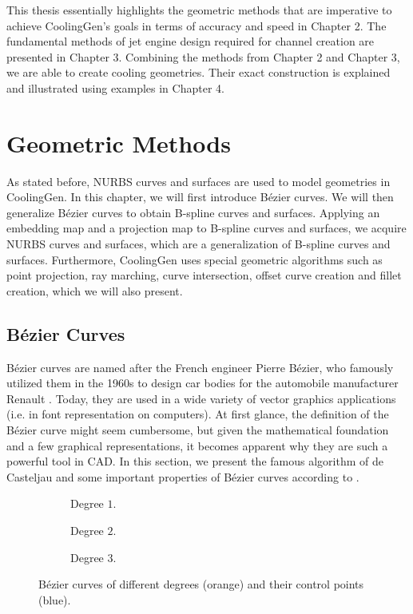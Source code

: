 \documentclass[a4paper, 11pt]{report}
\theoremstyle{definition}
\begin{document}
		This thesis essentially highlights the geometric methods that are imperative to achieve {CoolingGen}'s goals in terms of accuracy and speed in Chapter 2. The fundamental methods of jet engine design required for channel creation are presented in Chapter 3. Combining the methods from Chapter 2 and Chapter 3, we are able to create cooling geometries. Their exact construction is explained and illustrated using examples in Chapter 4.

\chapter{Geometric Methods}\label{chap:methods}
	As stated before, NURBS curves and surfaces are used to model geometries in CoolingGen. In this chapter, we will first introduce Bézier curves. We will then generalize Bézier curves to obtain B-spline curves and surfaces. Applying an embedding map and a projection map to B-spline curves and surfaces, we acquire NURBS curves and surfaces, which are a generalization of B-spline curves and surfaces. Furthermore, CoolingGen uses special geometric algorithms such as point projection, ray marching, curve intersection, offset curve creation and fillet creation, which we will also present.

\section{Bézier Curves}
	Bézier curves are named after the French engineer Pierre Bézier, who famously utilized them in the 1960s to design car bodies for the automobile manufacturer Renault \cite{Bezier1968}. Today, they are used in a wide variety of vector graphics applications (i.e. in font representation on computers). At first glance, the definition of the Bézier curve might seem cumbersome, but given the mathematical foundation and a few graphical representations, it becomes apparent why they are such a powerful tool in CAD. In this section, we present the famous algorithm of de Casteljau and some important properties of Bézier curves according to \cite{Farin2001}.

	\begin{figure}[H]
		\centering
		\begin{subfigure}{0.25\textwidth}
			
			\caption{Degree $1$.}
		\end{subfigure}
		\begin{subfigure}{0.25\textwidth}
			
			\caption{Degree $2$.}
		\end{subfigure}
		\begin{subfigure}{0.25\textwidth}
			
			\caption{Degree $3$.}
		\end{subfigure}
		\caption{Bézier curves of different degrees (orange) and their control points (blue).}
		\label{fig:bezierdifferentdegrees}
	\end{figure}
\end{document}
